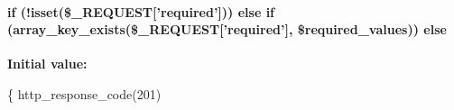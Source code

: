 \hypertarget{api_8php_a67ca52de78eee3b8906311c86f3d8a7e}{
\paragraph[{else}]{\setlength{\rightskip}{0pt plus 5cm}if (!isset(\$\-\_\-\-R\-E\-Q\-U\-E\-S\-T\mbox{[}'required'\mbox{]})) else if (array\-\_\-key\-\_\-exists(\$\-\_\-\-R\-E\-Q\-U\-E\-S\-T\mbox{[}'required'\mbox{]}, \$required\-\_\-values)) else}}\label{api_8php_a67ca52de78eee3b8906311c86f3d8a7e}
{\bfseries Initial value\-:}
\begin{DoxyCode}
\{
    http\_response\_code(201)
\end{DoxyCode}
